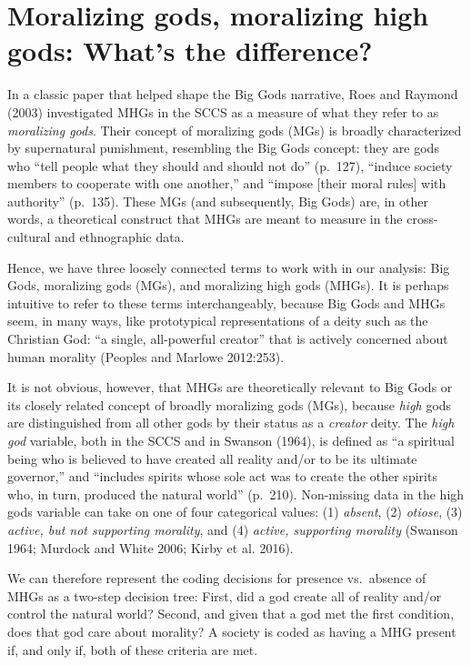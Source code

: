 \documentclass[
]{article}
\begin{document}
\section{Moralizing gods, moralizing high gods: What's the difference?}

In a classic paper that helped shape the Big Gods narrative, Roes and Raymond (2003) investigated MHGs in the SCCS as a measure of what they refer to as \emph{moralizing gods}. Their concept of moralizing gods (MGs) is broadly characterized by supernatural punishment, resembling the Big Gods concept: they are gods who ``tell people what they should and should not do'' (p.~127), ``induce society members to cooperate with one another,'' and ``impose {[}their moral rules{]} with authority'' (p.~135). These MGs (and subsequently, Big Gods) are, in other words, a theoretical construct that MHGs are meant to measure in the cross-cultural and ethnographic data.

Hence, we have three loosely connected terms to work with in our analysis: Big Gods, moralizing gods (MGs), and moralizing high gods (MHGs). It is perhaps intuitive to refer to these terms interchangeably, because Big Gods and MHGs seem, in many ways, like prototypical representations of a deity such as the Christian God: ``a single, all-powerful creator'' that is actively concerned about human morality (Peoples and Marlowe 2012:253).

It is not obvious, however, that MHGs are theoretically relevant to Big Gods or its closely related concept of broadly moralizing gods (MGs), because \emph{high} gods are distinguished from all other gods by their status as a \emph{creator} deity. The \emph{high god} variable, both in the SCCS and in Swanson (1964), is defined as ``a spiritual being who is believed to have created all reality and/or to be its ultimate governor,'' and ``includes spirits whose sole act was to create the other spirits who, in turn, produced the natural world'' (p.~210). Non-missing data in the high gods variable can take on one of four categorical values: (1) \emph{absent}, (2) \emph{otiose}, (3) \emph{active, but not supporting morality}, and (4) \emph{active, supporting morality} (Swanson 1964; Murdock and White 2006; Kirby et al. 2016).

We can therefore represent the coding decisions for presence vs.~absence of MHGs as a two-step decision tree: First, did a god create all of reality and/or control the natural world? Second, and given that a god met the first condition, does that god care about morality? A society is coded as having a MHG present if, and only if, both of these criteria are met.
\end{document}
